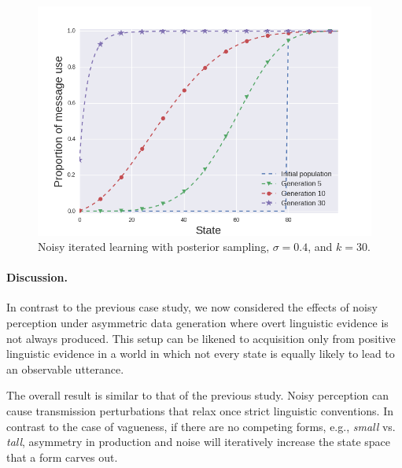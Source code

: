 \documentclass[10pt,a4paper]{article}
\begin{document}
\begin{figure}[ht]
\centering
    \includegraphics[scale=0.4]{../code/plots/deflation-sigma04.png}
  \caption{Noisy iterated learning with posterior sampling, $\sigma = 0.4$, and $k = 30$.}
  \label{fig:defl}
\end{figure}

\paragraph{Discussion.} In contrast to the previous case study, we now considered the effects
of noisy perception under asymmetric data generation where overt linguistic evidence is not
always produced. This setup can be likened to acquisition only from positive linguistic
evidence in a world in which not every state is equally likely to lead to an observable
utterance. %

The overall result is similar to that of the previous study. Noisy perception can cause
transmission perturbations that relax once strict linguistic conventions. In contrast to the
case of vagueness, if there are no competing forms, e.g., {\em small} vs. {\em tall}, asymmetry
in production and noise will iteratively increase the state space that a form carves out.
\end{document}
